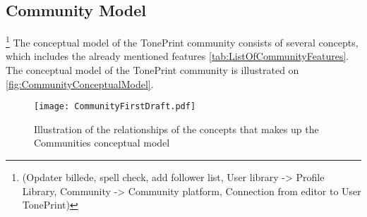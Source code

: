 \subsection{Community Model}
\label{CommunityModel}
\footnote{(Opdater billede, spell check, add follower list, User library -> Profile Library, Community -> Community platform, Connection from editor to User TonePrint)}
The conceptual model of the TonePrint community consists of several concepts, which includes the already mentioned features \autoref{tab:ListOfCommunityFeatures}. The conceptual model of the TonePrint community is illustrated on \autoref{fig:CommunityConceptualModel}.\\

\begin{figure}[H]
	\centering
	\texttt{[image: CommunityFirstDraft.pdf]}
	\caption{Illustration of the relationships of the concepts that makes up the Communities conceptual model}
	\label{fig:CommunityConceptualModel}
\end{figure}

